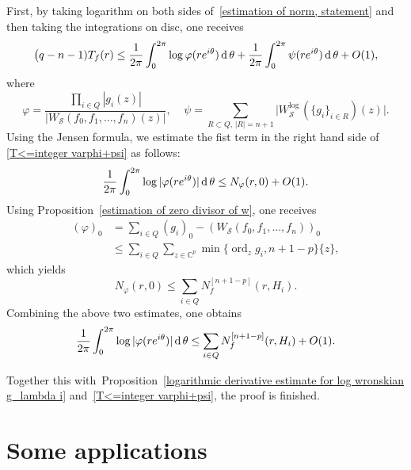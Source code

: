 \documentclass[english, 12pt]{amsart}
\DeclareMathOperator{\dif}{\text{\normalfont d}}
\DeclareMathOperator{\ord}{ord}
\def\log{\mathrm{log}\,}
\theoremstyle{plain}
\theoremstyle{remark}
\numberwithin{equation}{section}
\theoremstyle{plain}
\theoremstyle{named}
\begin{document}
First, by taking logarithm on both sides of~\eqref{estimation of norm, statement} and then taking the integrations on disc, one  receives
\begin{align}
	\label{T<=integer varphi+psi}
	\big(q-n-1)T_{f}(r)
	\leq
	\dfrac{1}{2\pi}
	\int_0^{2\pi}
	\log \varphi(re^{i\theta})
	\dif\theta
	+
	\dfrac{1}{2\pi}
	\int_0^{2\pi}
	\psi(re^{i\theta})\dif\theta
	+O(1),
\end{align}
	where
	\[
	\varphi
	=
	\dfrac{\prod_{i\in Q}| g_i(z)|}{|W_{\mathcal{S}}(f_0,f_1,\dots,f_n)(z)|},
	\ \ \ \ \ 
	\psi=
	\sum_{R\subset Q,\,|R|=n+1}
	\big|W^{\log}_{\mathcal{S}}(\{g_i\}_{i\in R})(z)\big|.
	\]
Using the Jensen formula, we estimate the fist term in the right hand side of \eqref{T<=integer varphi+psi} as follows:
\begin{align}
\dfrac{1}{2\pi}
\int_0^{2\pi}
\log|\varphi(re^{i\theta})|\dif\theta
\leq
N_{\varphi}(r,0)+O(1)\notag.
\end{align}
Using Proposition~\ref{estimation of zero divisor of w}, one receives
\begin{align*}
	(\varphi)_0
	&=
\sum_{i\in Q}(g_i)_0-(W_{\mathcal{S}}(f_0,f_1,\dots,f_n))_0\\
	&\leq
	\sum_{i\in Q}
	\sum_{z\in\mathbb{C}^p}\min\{\ord_z g_i,n+1-p\}\{z\},
	\end{align*}
	which yields
\begin{equation*}
N_{\varphi}(r,0)
\leq
\sum_{i\in Q}N_f^{[n+1-p]}(r,H_i).
\end{equation*}
Combining the above two estimates, one obtains
\begin{align}
\dfrac{1}{2\pi}
\int_0^{2\pi}
\log|\varphi(re^{i\theta})|\dif\theta
\leq
\sum_{i\in Q} N_{f}^{[n+1-p]}(r,H_i)
+
O(1).\notag
\end{align}

	
	Together this with~Proposition~\ref{logarithmic derivative estimate for log wronskian g_lambda i} and~\eqref{T<=integer varphi+psi}, the proof is finished.
	
	
	\section{Some applications}
	\label{section: applications}
\end{document}
